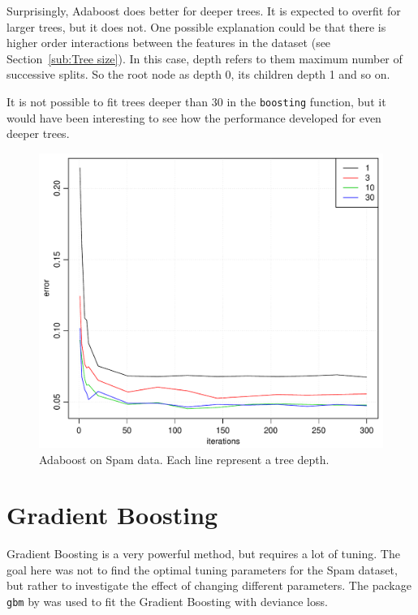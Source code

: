 Surprisingly, Adaboost does better for deeper trees. It is expected to overfit for larger trees, but it does not. One possible explanation could be that there is higher order interactions between the features in the dataset (see Section~\ref{sub:Tree size}). 
In this case, depth refers to them maximum number of successive splits. So the root node as depth 0, its children depth 1 and so on.

It is not possible to fit trees deeper than $30$ in the \verb+boosting+ function, but it would have been interesting to see how the performance developed for even deeper trees. 
%
\begin{figure}[htbp]
\begin{center}
    \includegraphics[scale=0.5]{./figures/adaboostSpam.pdf}
\end{center}
\caption{Adaboost on Spam data. Each line represent a tree depth.}
\label{fig:adaboostSpam}
\end{figure}
%
\section{Gradient Boosting}
\label{sec:SimGradBoost}
Gradient Boosting is a very powerful method, but requires a lot of tuning. The goal here was not to find the optimal tuning parameters for the Spam dataset, but rather to investigate the effect of changing different parameters. The package \verb+gbm+ by \cite{gbm} was used to fit the Gradient Boosting with deviance loss.

